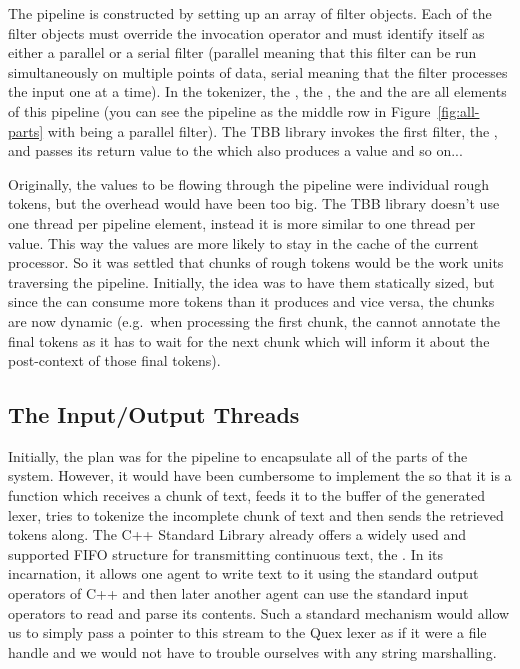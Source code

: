 The pipeline is constructed by setting up an array of filter objects. Each of
the filter objects must override the invocation operator and must identify
itself as either a parallel or a serial filter (parallel meaning that this
filter can be run simultaneously on multiple points of data, serial meaning
that the filter processes the input one at a time). In the tokenizer, the
, the , the 
and the  are all elements of this pipeline (you can see
the pipeline as the middle row in Figure~\ref{fig:all-parts} with
 being a parallel filter). The TBB library invokes the
first filter, the , and passes its return value to the
 which also produces a value and so on...

Originally, the values to be flowing through the pipeline were individual rough
tokens, but the overhead would have been too big. The TBB library doesn't use
one thread per pipeline element, instead it is more similar to one thread per
value. This way the values are more likely to stay in the cache of the current
processor. So it was settled that chunks of rough tokens would be the work
units traversing the pipeline. Initially, the idea was to have them statically
sized, but since the  can consume more tokens than it
produces and vice versa, the chunks are now dynamic (e.g.\ when processing the
first chunk, the  cannot annotate the final tokens as it has
to wait for the next chunk which will inform it about the post-context of those
final tokens).

\subsection{The Input/Output Threads}
\label{ssec:impl-parallel-io}

Initially, the plan was for the pipeline to encapsulate all of the parts of the
system. However, it would have been cumbersome to implement the
 so that it is a function which receives a chunk of text,
feeds it to the buffer of the generated lexer, tries to tokenize the incomplete
chunk of text and then sends the retrieved tokens along. The C++ Standard
Library already offers a widely used and supported FIFO structure for
transmitting continuous text, the . In its
 incarnation, it allows one agent to write text to it using
the standard output operators of C++ and then later another agent can use the
standard input operators to read and parse its contents. Such a standard
mechanism would allow us to simply pass a pointer to this stream to the Quex
lexer as if it were a file handle and we would not have to trouble ourselves
with any string marshalling.


